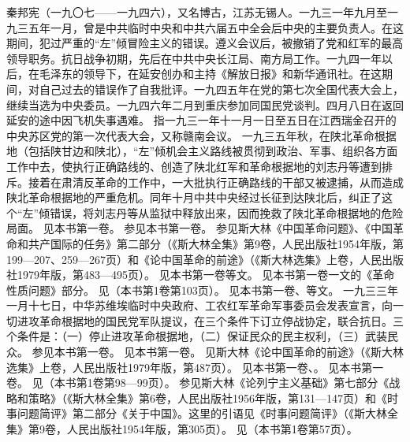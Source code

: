 \begin{maonote}
秦邦宪（一九〇七——一九四六），又名博古，江苏无锡人。一九三一年九月至一九三五年一月，曾是中共临时中央和中共六届五中全会后中央的主要负责人。在这期间，犯过严重的“左”倾冒险主义的错误。遵义会议后，被撤销了党和红军的最高领导职务。抗日战争初期，先后在中共中央长江局、南方局工作。一九四一年以后，在毛泽东的领导下，在延安创办和主持《解放日报》和新华通讯社。在这期间，对自己过去的错误作了自我批评。一九四五年在党的第七次全国代表大会上，继续当选为中央委员。一九四六年二月到重庆参加同国民党谈判。四月八日在返回延安的途中因飞机失事遇难。
指一九三一年十一月一日至五日在江西瑞金召开的中央苏区党的第一次代表大会，又称赣南会议。
一九三五年秋，在陕北革命根据地（包括陕甘边和陕北），“左”倾机会主义路线被贯彻到政治、军事、组织各方面工作中去，使执行正确路线的、创造了陕北红军和革命根据地的刘志丹等遭到排斥。接着在肃清反革命的工作中，一大批执行正确路线的干部又被逮捕，从而造成陕北革命根据地的严重危机。同年十月中共中央经过长征到达陕北后，纠正了这个“左”倾错误，将刘志丹等从监狱中释放出来，因而挽救了陕北革命根据地的危险局面。
见本书第一卷。
参见本书第一卷。
参见斯大林《中国革命问题》、《中国革命和共产国际的任务》第二部分（《斯大林全集》第9卷，人民出版社1954年版，第199—207、259—267页）和《论中国革命的前途》（《斯大林选集》上卷，人民出版社1979年版，第483—495页）。
见本书第一卷等文。
见本书第一卷一文的《革命性质问题》部分。
见（本书第1卷第103页）。
见本书第一卷、等文。
一九三三年一月十七日，中华苏维埃临时中央政府、工农红军革命军事委员会发表宣言，向一切进攻革命根据地的国民党军队提议，在三个条件下订立停战协定，联合抗日。三个条件是：（一）停止进攻革命根据地，（二）保证民众的民主权利，（三）武装民众。
参见本书第一卷。
见本书第一卷。
见斯大林《论中国革命的前途》（《斯大林选集》上卷，人民出版社1979年版，第487页）。
见本书第一卷、。
见本书第一卷。
见（本书第1卷第98—99页）。
参见斯大林《论列宁主义基础》第七部分《战略和策略》（《斯大林全集》第6卷，人民出版社1956年版，第131—147页）和《时事问题简评》第二部分《关于中国》。这里的引语见《时事问题简评》（《斯大林全集》第9卷，人民出版社1954年版，第305页）。
见（本书第1卷第57页）。

\end{maonote}
